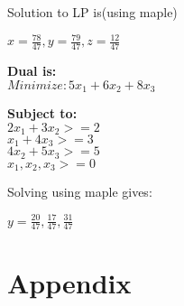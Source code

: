 \documentclass[11pt]{article}
\begin{document}
Solution to LP is(using maple)
\begin{center}
$x = \frac{78}{47}, y = \frac{79}{47}, z = \frac{12}{47}$
\end{center}

\textbf{Dual is:} \\
$Minimize: 5x_{1} + 6x_{2} + 8x_{3}$\\
\begin{center}
\textbf{Subject to:} \\
$2x_{1} + 3x_{2} >= 2$\\
$x_{1} + 4x_{3} >= 3$\\
$4x_{2} + 5x_{3} >= 5$ \\
$x_{1}, x_{2}, x_{3} >= 0$
\end{center}

Solving using maple gives:

\begin{center}
$ y = \frac{20}{47}, \frac{17}{47}, \frac{31}{47}$
\end{center}

\section{Appendix}
\end{document}

